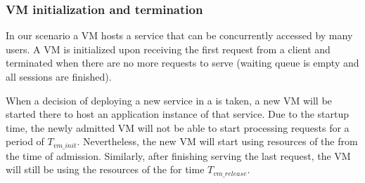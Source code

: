 \subsubsection{VM initialization and termination}
In our scenario a VM hosts a service that can be concurrently accessed by many users.
A VM is initialized upon receiving the first request from a client and terminated when there are no more requests to serve (waiting queue is empty and all sessions are finished).

When a decision of deploying a new service in a \dc{} is taken, a new VM will be started there to host an application instance of that service.
Due to the startup time, the newly admitted VM will not be able to start processing requests for a period of $T_{vm\_init}$. 
Nevertheless, the new VM will start using resources of the \dc{} from the time of admission.
Similarly, after finishing serving the last request, the VM will still be using the resources of the \dc{} for time $T_{vm\_release}$.


